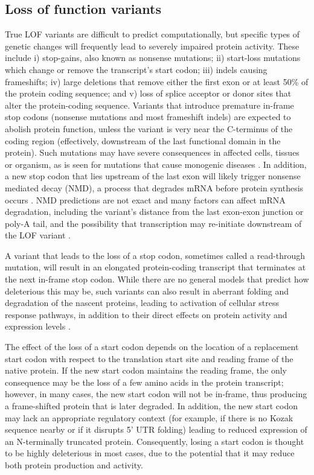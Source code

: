 \subsection{Loss of function variants}

True LOF variants are difficult to predict computationally, but specific types of genetic changes will frequently lead to severely impaired protein activity. These include i) stop-gains, also known as nonsense mutations; ii) start-loss mutations which change or remove the transcript's start codon; iii) indels causing frameshifts; iv) large deletions that remove either the first exon or at least 50\% of the protein coding sequence; and v) loss of splice acceptor or donor sites that alter the protein-coding sequence. Variants that introduce premature in-frame stop codons (nonsense mutations and most frameshift indels) are expected to abolish protein function, unless the variant is very near the C-terminus of the coding region \cite{yamaguchi2008distribution} (effectively, downstream of the last functional domain in the protein). Such mutations may have severe consequences in affected cells, tissues or organism, as is seen for mutations that cause monogenic diseases \cite{scheper2007translation}. In addition, a new stop codon that lies upstream of the last exon will likely trigger nonsense mediated decay (NMD), a process that degrades mRNA before protein synthesis occurs \cite{nagy1998rule}. NMD predictions are not exact and many factors can affect mRNA degradation, including the variant's distance from the last exon-exon junction or poly-A tail, and the possibility that transcription may re-initiate downstream of the LOF variant \cite{brogna2009nonsense}.

A variant that leads to the loss of a stop codon, sometimes called a read-through mutation, will result in an elongated protein-coding transcript that terminates at the next in-frame stop codon. While there are no general models that predict how deleterious this may be, such variants can also result in aberrant folding and degradation of the nascent proteins, leading to activation of cellular stress response pathways, in addition to their direct effects on protein activity and expression levels \cite{scheper2007translation}.

The effect of the loss of a start codon depends on the location of a replacement start codon with respect to the translation start site and reading frame of the native protein. If the new start codon maintains the reading frame, the only consequence may be the loss of a few amino acids in the protein transcript; however, in many cases, the new start codon will not be in-frame, thus producing a frame-shifted protein that is later degraded. In addition, the new start codon may lack an appropriate regulatory context (for example, if there is no Kozak sequence nearby or if it disrupts 5' UTR folding) leading to reduced expression of an N-terminally truncated protein. Consequently, losing a start codon is thought to be highly deleterious in most cases, due to the potential that it may reduce both protein production and activity.

